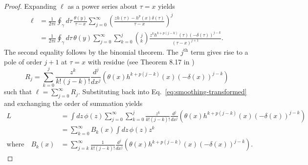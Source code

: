 \begin{proof}
Expanding $\ell$ as a power series about $\tau=x$ yields
\begin{align*}
\ell & =\frac{1}{2\pi i}\oint_{\gamma}d\tau\,\frac{\theta\left(y\right)}{\tau-x}\sum_{j=0}^{\infty}\left(\frac{zh\left(\tau\right)-h^{p}\left(x\right)\delta\left(\tau\right)}{\tau-x}\right)^{j}\\
 & =\frac{1}{2\pi i}\oint_{\gamma}d\tau\,\theta\left(y\right)\sum_{j=0}^{\infty}\sum_{k=0}^{j}\binom{j}{k}\frac{z^{k}h^{k+p\left(j-k\right)}\left(\tau\right)\left(-\delta\left(\tau\right)\right)^{j-k}}{\left(\tau-x\right)^{j+1}}.
\end{align*}
The second equality follows by the binomial theorem. The $j^{\text{th}}$ term gives rise to a pole of order $j+1$ at $\tau=x$ with residue (see Theorem 8.17 in \cite{Howie2008})
\[
R_{j}=\sum_{k=0}^{j}\frac{z^{k}}{k!\left(j-k\right)!}\frac{d^{j}}{dx^{j}}\left(\theta\left(x\right)h^{k+p\left(j-k\right)}\left(x\right)\left(-\delta\left(x\right)\right)^{j-k}\right)
\]
such that $\ell=\sum_{j=0}^{\infty}R_{j}$. Substituting back into Eq.~\eqref{eq:smoothing-transformed} and exchanging the order of summation yields
\begin{align*}
L & =\int dz\,\phi\left(z\right)\sum_{j=0}^{\infty}\sum_{k=0}^{j}\frac{z^{k}}{k!\left(j-k\right)!}\frac{d^{j}}{dx^{j}}\left(\theta\left(x\right)h^{k+p\left(j-k\right)}\left(x\right)\left(-\delta\left(x\right)\right)^{j-k}\right)\\
 & =\sum_{k=0}^{\infty}B_{k}\left(x\right)\int dz\,\phi\left(z\right)z^{k}\\
\text{where}\quad B_{k}\left(x\right) & =\sum_{j=k}^{\infty}\frac{1}{k!\left(j-k\right)!}\frac{d^{j}}{dx^{j}}\left(\theta\left(x\right)h^{k+p\left(j-k\right)}\left(x\right)\left(-\delta\left(x\right)\right)^{j-k}\right).
\end{align*}

\end{proof}

